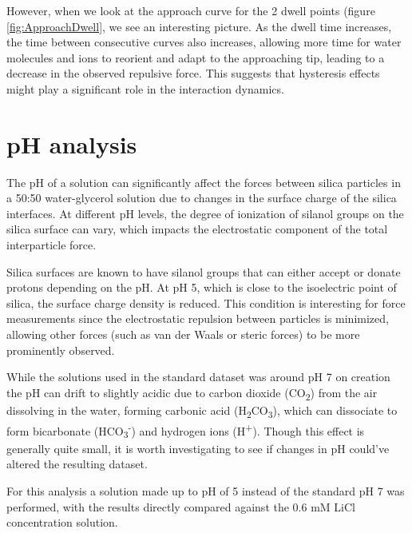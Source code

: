However, when we look at the approach curve for the 2 dwell points (figure \ref{fig:ApproachDwell}, we see an interesting picture. As the dwell time increases, the time between consecutive curves also increases, allowing more time for water molecules and ions to reorient and adapt to the approaching tip, leading to a decrease in the observed repulsive force. This suggests that hysteresis effects might play a significant role in the interaction dynamics.

\newpage
\section{pH analysis}

The pH of a solution can significantly affect the forces between silica particles in a 50:50 water-glycerol solution due to changes in the surface charge of the silica interfaces. At different pH levels, the degree of ionization of silanol groups on the silica surface can vary, which impacts the electrostatic component of the total interparticle force. 

Silica surfaces are known to have silanol groups that can either accept or donate protons depending on the pH. At pH 5, which is close to the isoelectric point of silica, the surface charge density is reduced. This condition is interesting for force measurements since the electrostatic repulsion between particles is minimized, allowing other forces (such as van der Waals or steric forces) to be more prominently observed. \cite{Pavan2019}

While the solutions used in the standard dataset was around pH 7 on creation the pH can drift to slightly acidic due to carbon dioxide (CO\textsubscript{2}) from the air dissolving in the water, forming carbonic acid (H\textsubscript{2}CO\textsubscript{3}), which can dissociate to form bicarbonate (HCO\textsubscript{3}\textsuperscript{-}) and hydrogen ions (H\textsuperscript{+}). Though this effect is generally quite small, it is worth investigating to see if changes in pH could've altered the resulting dataset.

For this analysis a solution made up to pH of 5 instead of the standard pH 7 was performed, with the results directly compared against the 0.6 mM LiCl concentration solution. 

